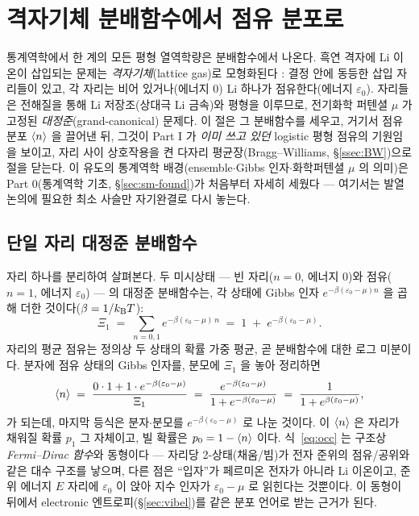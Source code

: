 \section{격자기체 분배함수에서 점유 분포로}\label{sec:partition}

통계역학에서 한 계의 모든 평형 열역학량은 분배함수에서 나온다. 흑연 격자에 Li 이온이 삽입되는 문제는
\emph{격자기체}(lattice gas)로 모형화된다 \cite{newman,huggins2009}: 결정 안에 동등한 삽입 자리들이 있고,
각 자리는 비어 있거나(에너지 $0$) Li 하나가 점유한다(에너지 $\varepsilon_0$). 자리들은 전해질을 통해 Li
저장조(상대극 Li 금속)와 평형을 이루므로, 전기화학 퍼텐셜 $\mu$ 가 고정된 \emph{대정준}(grand-canonical)
문제다. 이 절은 그 분배함수를 세우고, 거기서 점유 분포 $\langle n\rangle$ 을 끌어낸 뒤, 그것이 Part I 가 \emph{이미
쓰고 있던} logistic 평형 점유의 기원임을 보이고, 자리 사이 상호작용을 켠 다자리 평균장(Bragg--Williams,
\S\ref{ssec:BW})으로 절을 닫는다. 이 유도의 통계역학 배경(ensemble$\cdot$Gibbs 인자$\cdot$화학퍼텐셜 $\mu$ 의
의미)은 Part 0(통계역학 기초, \S\ref{sec:sm-found})가 처음부터 자세히 세웠다 --- 여기서는 발열 논의에 필요한 최소
사슬만 자기완결로 다시 놓는다.

\subsection{단일 자리 대정준 분배함수}\label{ssec:site}
자리 하나를 분리하여 살펴본다. 두 미시상태 --- 빈 자리($n=0$, 에너지 $0$)와 점유($n=1$, 에너지
$\varepsilon_0$) --- 의 대정준 분배함수는, 각 상태에 Gibbs 인자 $e^{-\beta(\varepsilon_0-\mu)n}$ 을 곱해 더한
것이다($\beta=1/k_{\mathrm B} T$):
\begin{equation}
\Xi_1 \;=\; \sum_{n=0,1} e^{-\beta(\varepsilon_0-\mu)\,n}
\;=\; 1 \;+\; e^{-\beta(\varepsilon_0-\mu)}.
\label{eq:Z1}
\end{equation}
자리의 평균 점유는 정의상 두 상태의 확률 가중 평균, 곧 분배함수에 대한 로그 미분이다. 분자에 점유 상태의
Gibbs 인자를, 분모에 $\Xi_1$ 을 놓아 정리하면
\begin{equation}
\langle n\rangle \;=\; \frac{0\cdot 1 + 1\cdot e^{-\beta(\varepsilon_0-\mu)}}{\Xi_1}
\;=\; \frac{e^{-\beta(\varepsilon_0-\mu)}}{1+e^{-\beta(\varepsilon_0-\mu)}}
\;=\; \frac{1}{1+e^{\beta(\varepsilon_0-\mu)}},
\label{eq:occ}
\end{equation}
가 되는데, 마지막 등식은 분자$\cdot$분모를 $e^{-\beta(\varepsilon_0-\mu)}$ 로 나눈 것이다. 이 $\langle n\rangle$ 은 자리가
채워질 확률 $p_1$ 그 자체이고, 빌 확률은 $p_0=1-\langle n\rangle$ 이다. 식~\eqref{eq:occ} 는 구조상 \emph{Fermi--Dirac
함수}와 동형이다 --- 자리당 2-상태(채움/빔)가 전자 준위의 점유/공위와 같은 대수 구조를 낳으며, 다른 점은
``입자''가 페르미온 전자가 아니라 Li 이온이고, 준위 에너지 $E$ 자리에 $\varepsilon_0$ 이 앉아 지수 인자가 $\varepsilon_0-\mu$ 로 읽힌다는 것뿐이다. 이 동형이
뒤에서 electronic 엔트로피(\S\ref{sec:vibel})를 같은 분포 언어로 받는 근거가 된다.

